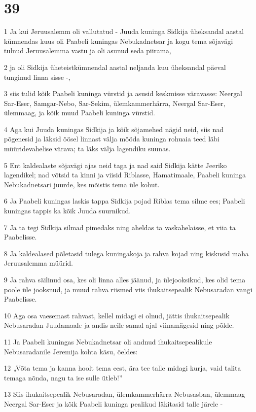 \chapter{39}

\par 1 Ja kui Jeruusalemm oli vallutatud - Juuda kuninga Sidkija üheksandal aastal kümnendas kuus oli Paabeli kuningas Nebukadnetsar ja kogu tema sõjavägi tulnud Jeruusalemma vastu ja oli asunud seda piirama,
\par 2 ja oli Sidkija üheteistkümnendal aastal neljanda kuu üheksandal päeval tunginud linna sisse -,
\par 3 siis tulid kõik Paabeli kuninga vürstid ja asusid keskmisse väravasse: Neergal Sar-Eser, Samgar-Nebo, Sar-Sekim, ülemkammerhärra, Neergal Sar-Eser, ülemmaag, ja kõik muud Paabeli kuninga vürstid.
\par 4 Aga kui Juuda kuningas Sidkija ja kõik sõjamehed nägid neid, siis nad põgenesid ja läksid öösel linnast välja mööda kuninga rohuaia teed läbi müüridevahelise värava; ta läks välja lagendiku suunas.
\par 5 Ent kaldealaste sõjavägi ajas neid taga ja nad said Sidkija kätte Jeeriko lagendikel; nad võtsid ta kinni ja viisid Riblasse, Hamatimaale, Paabeli kuninga Nebukadnetsari juurde, kes mõistis tema üle kohut.
\par 6 Ja Paabeli kuningas laskis tappa Sidkija pojad Riblas tema silme ees; Paabeli kuningas tappis ka kõik Juuda suurnikud.
\par 7 Ja ta tegi Sidkija silmad pimedaks ning aheldas ta vaskahelaisse, et viia ta Paabelisse.
\par 8 Ja kaldealased põletasid tulega kuningakoja ja rahva kojad ning kiskusid maha Jeruusalemma müürid.
\par 9 Ja rahva säilinud osa, kes oli linna alles jäänud, ja ülejooksikud, kes olid tema poole üle jooksnud, ja muud rahva riismed viis ihukaitsepealik Nebusaradan vangi Paabelisse.
\par 10 Aga osa vaesemast rahvast, kellel midagi ei olnud, jättis ihukaitsepealik Nebusaradan Juudamaale ja andis neile samal ajal viinamägesid ning põlde.
\par 11 Ja Paabeli kuningas Nebukadnetsar oli andnud ihukaitsepealikule Nebusaradanile Jeremija kohta käsu, öeldes:
\par 12 „Võta tema ja kanna hoolt tema eest, ära tee talle midagi kurja, vaid talita temaga nõnda, nagu ta ise sulle ütleb!”
\par 13 Siis ihukaitsepealik Nebusaradan, ülemkammerhärra Nebusasban, ülemmaag Neergal Sar-Eser ja kõik Paabeli kuninga pealikud läkitasid talle järele -
